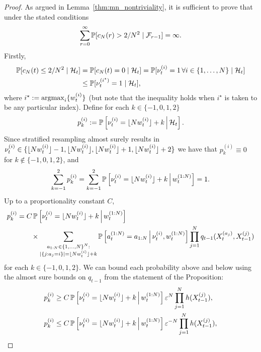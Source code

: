 \begin{proof}
As argued in Lemma~\ref{thm:mn_nontriviality}, it is sufficient to prove that under the stated conditions
\begin{equation*}
\sum_{r=0}^\infty \mathbb{P}[ c_N(r) > 2/N^2  \mid \mathcal{F}_{r-1} ] = \infty .
\end{equation*}
Firstly,
\begin{align}
\mathbb{P}[ c_N(t) \leq 2/N^2 \mid \mathcal{H}_t ]
&= \mathbb{P}[ c_N(t) =0 \mid \mathcal{H}_t ]
= \mathbb{P}[ \nu_t^{(i)} =1 \,\forall i\in\{1,\dots,N\} \mid \mathcal{H}_t ] \notag\\
&\leq \mathbb{P}[ \nu_t^{(i^\star)} =1 \mid \mathcal{H}_t ] , \label{eq:cNnonzero}
\end{align}
where $i^\star := \operatorname*{argmax}_i \{ w_t^{(i)} \}$ (but note that the inequality holds when $i^\star$ is taken to be any particular index).
Define for each $k\in\{-1,0,1,2\}$
\begin{equation}\label{eq:pk_defn}
p_k^{(i)} := \mathbb{P} \left[ \nu_t^{(i)} = \lfloor N w_t^{(i)} \rfloor + k \,\middle|\, \mathcal{H}_t \right] .
\end{equation}
Since stratified resampling almost surely results in $\nu_t^{(i)} \in \{ \lfloor N w_t^{(i)} \rfloor-1, \lfloor N w_t^{(i)} \rfloor, \lfloor N w_t^{(i)} \rfloor+1, \lfloor N w_t^{(i)} \rfloor+2 \}$ we have that $p_k^{(i)} \equiv 0$ for $k\notin \{-1,0,1,2\}$, and
\begin{equation*}
\sum_{k=-1}^2 p_k^{(i)} 
= \sum_{k=-1}^2 \mathbb{P} \left[ \nu_t^{(i)} = \lfloor N w_t^{(i)} \rfloor + k \,\middle|\, w_t^{(1:N)} \right]
= 1 .
\end{equation*}
Up to a proportionality constant $C$,
\begin{align*}
p_k^{(i)} 
&= C \, \mathbb{P} \left[ \nu_t^{(i)} = \lfloor N w_t^{(i)} \rfloor + k \,\middle|\, w_t^{(1:N)} \right] \\
    &\qquad \times \sum_{\substack{a_{1:N} \in \{1,\dots,N\}^N : 
        \\ |\{j: a_j=i\}|=\lfloor N w_t^{(i)} \rfloor +k }}
        \mathbb{P}\left[ a_t^{(1:N)} = a_{1:N} \,\middle|\, \nu_t^{(i)}, w_t^{(1:N)} \right]
        \prod_{j=1}^N q_{t-1}( X_t^{(a_j)}, X_{t-1}^{(j)} ) 
\end{align*}
for each $k\in\{-1,0,1,2\}$.
We can bound each probability above and below using the almost sure bounds on $q_{t-1}$ from the statement of the Proposition:
\begin{align*}
p_k^{(i)}
&\geq C \, \Prob \left[ \nu_t^{(i)} = \flnw + k \midd w_t^{(1:N)} \right] \varepsilon^N
        \prod_{j=1}^N h(X_{t-1}^{(j)}) , \\
p_k^{(i)}
&\leq C \, \Prob \left[ \nu_t^{(i)} = \flnw + k \midd w_t^{(1:N)} \right] 
        \varepsilon^{-N} \prod_{j=1}^N h(X_{t-1}^{(j)}) ,

\end{align*}
\end{proof}

